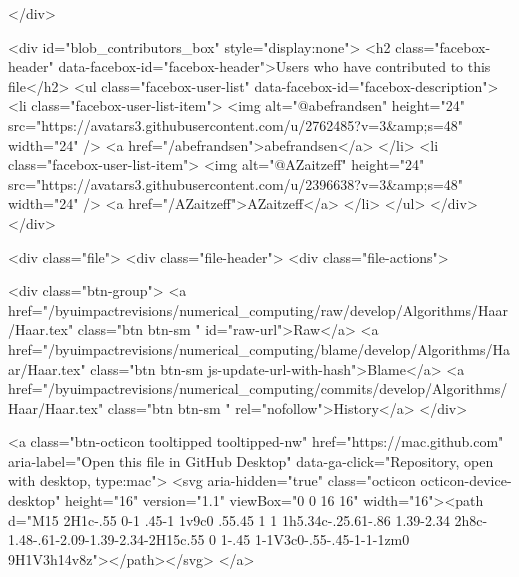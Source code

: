     </div>

    <div id="blob_contributors_box" style="display:none">
      <h2 class="facebox-header" data-facebox-id="facebox-header">Users who have contributed to this file</h2>
      <ul class="facebox-user-list" data-facebox-id="facebox-description">
          <li class="facebox-user-list-item">
            <img alt="@abefrandsen" height="24" src="https://avatars3.githubusercontent.com/u/2762485?v=3&amp;s=48" width="24" />
            <a href="/abefrandsen">abefrandsen</a>
          </li>
          <li class="facebox-user-list-item">
            <img alt="@AZaitzeff" height="24" src="https://avatars3.githubusercontent.com/u/2396638?v=3&amp;s=48" width="24" />
            <a href="/AZaitzeff">AZaitzeff</a>
          </li>
      </ul>
    </div>
  </div>

<div class="file">
  <div class="file-header">
  <div class="file-actions">

    <div class="btn-group">
      <a href="/byuimpactrevisions/numerical_computing/raw/develop/Algorithms/Haar/Haar.tex" class="btn btn-sm " id="raw-url">Raw</a>
        <a href="/byuimpactrevisions/numerical_computing/blame/develop/Algorithms/Haar/Haar.tex" class="btn btn-sm js-update-url-with-hash">Blame</a>
      <a href="/byuimpactrevisions/numerical_computing/commits/develop/Algorithms/Haar/Haar.tex" class="btn btn-sm " rel="nofollow">History</a>
    </div>

        <a class="btn-octicon tooltipped tooltipped-nw"
           href="https://mac.github.com"
           aria-label="Open this file in GitHub Desktop"
           data-ga-click="Repository, open with desktop, type:mac">
            <svg aria-hidden="true" class="octicon octicon-device-desktop" height="16" version="1.1" viewBox="0 0 16 16" width="16"><path d="M15 2H1c-.55 0-1 .45-1 1v9c0 .55.45 1 1 1h5.34c-.25.61-.86 1.39-2.34 2h8c-1.48-.61-2.09-1.39-2.34-2H15c.55 0 1-.45 1-1V3c0-.55-.45-1-1-1zm0 9H1V3h14v8z"></path></svg>
        </a>

